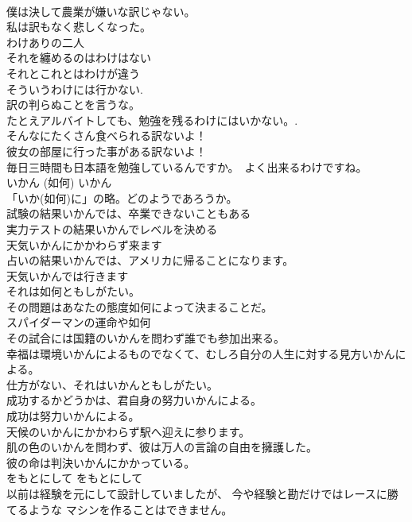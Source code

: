 \documentclass[8pt]{extreport}
\begin{document}
\begin{CJK}{UTF8}{min}
\\	僕は決して農業が嫌いな訳じゃない。   
\\	私は訳もなく悲しくなった。  
\\	わけありの二人  
\\	それを纏めるのはわけはない  
\\	それとこれとはわけが違う  
\\	そういうわけには行かない.  
\\	訳の判らぬことを言うな。  
\\	たとえアルバイトしても、勉強を残るわけにはいかない。.  
\\	そんなにたくさん食べられる訳ないよ！   
\\	彼女の部屋に行った事がある訳ないよ！  
\\	毎日三時間も日本語を勉強しているんですか。　よく出来るわけですね。
\\	いかん (如何)	いかん	
\\	「いか(如何)に」の略。どのようであろうか。	
\\	試験の結果いかんでは、卒業できないこともある  
\\	実力テストの結果いかんでレベルを決める  
\\	天気いかんにかかわらず来ます  
\\	占いの結果いかんでは、アメリカに帰ることになります。  
\\	天気いかんでは行きます  
\\	それは如何ともしがたい。  
\\	その問題はあなたの態度如何によって決まることだ。  
\\	スパイダーマンの運命や如何  
\\	その試合には国籍のいかんを問わず誰でも参加出来る。   
\\	幸福は環境いかんによるものでなくて、むしろ自分の人生に対する見方いかんによる。   
\\	仕方がない、それはいかんともしがたい。   
\\	成功するかどうかは、君自身の努力いかんによる。   
\\	成功は努力いかんによる。   
\\	天候のいかんにかかわらず駅へ迎えに参ります。   
\\	肌の色のいかんを問わず、彼は万人の言論の自由を擁護した。   
\\	彼の命は判決いかんにかかっている。   
\\	をもとにして	をもとにして	
\\	以前は経験を元にして設計していましたが、 今や経験と勘だけではレースに勝てるような マシンを作ることはできません。  

\end{CJK}
\end{document}
